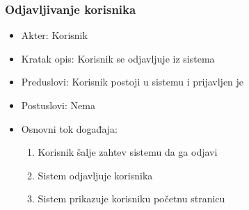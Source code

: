 \documentclass[a4paper]{article}
\begin{document}
\subsubsection{Odjavljivanje korisnika}
\label{subsubsection:odjavljivanjekorisnika}
\begin{itemize}
    \item Akter: Korisnik
    \item Kratak opis: Korisnik se odjavljuje iz sistema
    \item Preduslovi: Korisnik postoji u sistemu i prijavljen je
    \item Postuslovi: Nema
    \item Osnovni tok događaja:
        \begin{enumerate}
            \item Korisnik šalje zahtev sistemu da ga odjavi
            \item Sistem odjavljuje korisnika
            \item Sistem prikazuje korisniku početnu stranicu
        \end{enumerate}
\end{itemize}

\newpage
\end{document}
